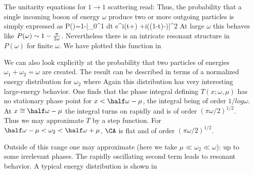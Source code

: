  
The unitarity equations for $1\to 1$ scattering read:
\eqn{}
Thus, the probability that a single incoming boson of energy $\omega$
produce two or more outgoing particles is simply expressed as
\eqn\partprod
{P(\omega)=1-\Biggl|\int_0^1 dt
e^{i\Theta(t\omega+\mu)
+i\Theta((1-t)\omega-\mu)}\Biggr|^2
}
At large $\omega$ this behaves like $P(\omega)\sim 1-{\pi\over 2\omega}$.
Nevertheless there is an intricate resonant structure in $P(\omega)$
for finite $\omega$.
We have plotted this function in
\fig{}
 
 
We can also look explicitly at the probability that two
particles of energies $\omega_1+\omega_2=\omega$ are created.
The result can be described in terms of a normalized energy
distribution for $\omega_2$
\eqn{}
where
\eqn{}
Again this distribution has very interesting large-energy behavior.
One finds that the phase integral defining
$T(x;\omega,\mu)$ has no stationary phase point
for $x<\half \omega-\mu$, the integral being of order $1/log \omega$.
At $x\cong \half \omega-\mu$ the integral turns on rapidly  and is
of order $(\pi \omega/2)^{1/2}$. Thus we may approximate $T$ by a
step function. For
$\half \omega-\mu<\omega_2<\half\omega+\mu$,
$\CA$ is flat and of order $(\pi \omega/2)^{1/2}$.
 
Outside of this range one may approximate
(here we take $\mu\ll \omega_2\ll \omega$):
\eqn{}
up to some irrelevant phases.
The rapidly oscillating second term leads to resonant behavior.
A typical energy distribution is shown in
\fig{}
 
